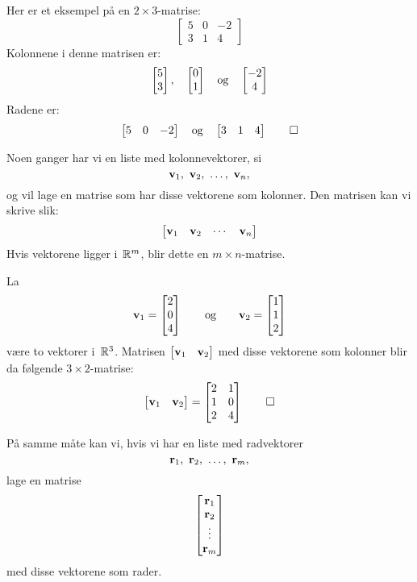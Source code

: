 \begin{ex}
Her er et eksempel på en $2 \times 3$-matrise:
\[
\begin{bmatrix}
5 & 0 & -2 \\
3 & 1 &  4
\end{bmatrix}
\]
Kolonnene i denne matrisen er:
\[
\begin{bmatrix} 5 \\ 3 \end{bmatrix},\quad
\begin{bmatrix} 0 \\ 1 \end{bmatrix}\quad\text{og}\quad
\begin{bmatrix} -2 \\ 4 \end{bmatrix}
\]
Radene er:
\[
\begin{bmatrix}
5 & 0 & -2
\end{bmatrix}
\quad\text{og}\quad
\begin{bmatrix}
3 & 1 &  4
\end{bmatrix}
\qedhere
\]
\end{ex}

Noen ganger har vi en liste med kolonnevektorer, si
\[
\mathbf{v}_1,\ \mathbf{v}_2,\ \ldots,\ \mathbf{v}_n,
\]
og vil lage en matrise som har disse vektorene som kolonner.
Den matrisen kan vi skrive slik:
\[
\begin{bmatrix}
\mathbf{v}_1 & \mathbf{v}_2 & \cdots & \mathbf{v}_n
\end{bmatrix}
\]
Hvis vektorene ligger i~$\mathbb{R}^m$, blir dette en $m \times n$-matrise.

\begin{ex}
La
\[
\mathbf{v}_1 = \begin{bmatrix} 2 \\ 0 \\ 4 \end{bmatrix}
\qquad\text{og}\qquad
\mathbf{v}_2 = \begin{bmatrix} 1 \\ 1 \\ 2 \end{bmatrix}
\]
være to vektorer i~$\mathbb{R}^3$.  Matrisen
$\begin{bmatrix} \mathbf{v}_1 & \mathbf{v}_2 \end{bmatrix}$ med disse vektorene
som kolonner blir da følgende $3 \times 2$-matrise:
\[
\begin{bmatrix} \mathbf{v}_1 & \mathbf{v}_2 \end{bmatrix}
=
\begin{bmatrix}
2 & 1 \\
1 & 0 \\
2 & 4
\end{bmatrix}
\qedhere
\]
\end{ex}

På samme måte kan vi, hvis vi har en liste med radvektorer
\[
\mathbf{r}_1,\ \mathbf{r}_2,\ \ldots,\ \mathbf{r}_m,
\]
lage en matrise
\[
\begin{bmatrix}
\mathbf{r}_1 \\
\mathbf{r}_2 \\
\vdots \\
\mathbf{r}_m
\end{bmatrix}
\]
med disse vektorene som rader.

